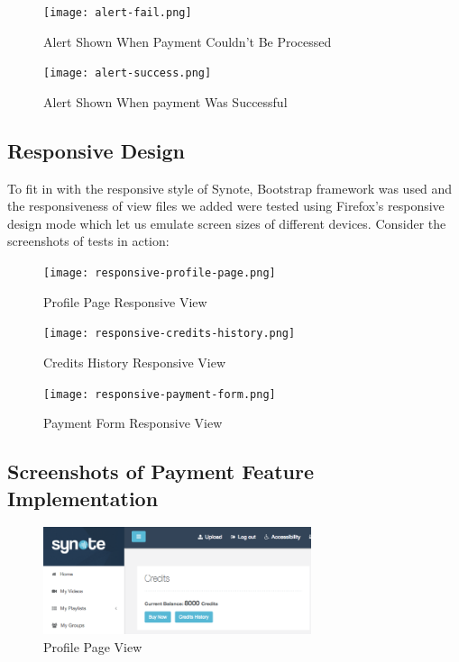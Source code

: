 \begin{figure}[!hbt]
  	\centering
 	\texttt{[image: alert-fail.png]}
  	\caption{Alert Shown When Payment Couldn't Be Processed}
 	\label{fig:alert-success}
\end{figure}

\begin{figure}[!hbt]
  	\centering
 	\texttt{[image: alert-success.png]}
  	\caption{Alert Shown When payment Was Successful}
 	\label{fig:alert-fail}
\end{figure}

\subsection{Responsive Design}
\label{subsec:responsive-design}

To fit in with the responsive style of Synote, Bootstrap framework was used and the responsiveness of view files we added were tested using Firefox’s responsive design mode \cite{firefoxresponsive} which let us emulate screen sizes of different devices. Consider the screenshots of tests in action:\\

\begin{figure}[!htb]
    \centering
    \begin{minipage}{.45\textwidth}
        \centering
        \texttt{[image: responsive-profile-page.png]}
          \caption{Profile Page Responsive View}
        \label{fig:responsive-profile}
        \texttt{[image: responsive-credits-history.png]}
          \caption{Credits History Responsive View}
        \label{fig:responsive-credits-history}
    \end{minipage}%
    \hspace{0.1cm}
    \begin{minipage}{0.5\textwidth}
        \centering
        \centering
      \texttt{[image: responsive-payment-form.png]}
        \caption{Payment Form Responsive View}
      \label{fig:responsive-payment-form}
    \end{minipage}
\end{figure}

\subsection{Screenshots of Payment Feature Implementation}
\label{subsec:screenshots-payment-feature-implementation}

\begin{figure}[!hbt]
    \centering
  \includegraphics[width=0.7\textwidth]{screenshot-profile-page.png}
    \caption{Profile Page View}
  \label{fig:profile-screenshot}
\end{figure}

